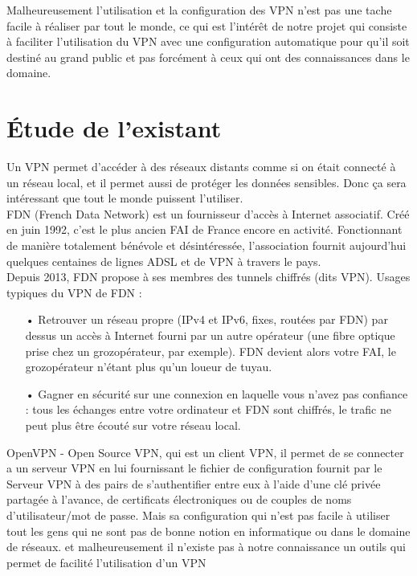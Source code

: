 \documentclass[12pt,a4paper]{article}
\begin{document}
Malheureusement l'utilisation et la configuration des VPN n'est pas une tache facile à réaliser par tout le monde, ce qui est l'intérêt de notre projet qui consiste à faciliter l'utilisation du VPN avec une configuration automatique pour qu'il soit destiné au grand public et pas forcément à ceux qui ont des connaissances dans le domaine.\\
\newpage

\section{Étude de l'existant}
Un VPN permet d'accéder à des réseaux distants comme si on était connecté à un réseau local, et il permet aussi de protéger les données sensibles. Donc ça sera intéressant que tout le monde puissent l'utiliser.\\

FDN (French Data Network) est un fournisseur d'accès à Internet associatif.
Créé en juin 1992, c'est le plus ancien FAI de France encore en activité. Fonctionnant de manière totalement bénévole et désintéressée, l'association fournit aujourd'hui quelques centaines de lignes ADSL et de VPN à travers le pays.\\

Depuis 2013, FDN propose à ses membres des tunnels chiffrés (dits VPN).
Usages typiques du VPN de FDN :
\begin{itemize}
\item[•]Retrouver un réseau propre (IPv4 et IPv6, fixes, routées par FDN) par dessus un accès à Internet fourni par un autre opérateur (une fibre optique prise chez un grozopérateur, par exemple). FDN devient alors votre FAI, le grozopérateur n’étant plus qu’un loueur de tuyau.\\
\item[•]Gagner en sécurité sur une connexion en laquelle vous n’avez pas confiance : tous les échanges entre votre ordinateur et FDN sont chiffrés, le trafic ne peut plus être écouté sur votre réseau local.\\
\end{itemize}

OpenVPN - Open Source VPN, qui est un client VPN,  il permet de se connecter a un serveur VPN  en lui fournissant le fichier de configuration fournit par le Serveur VPN à des pairs de s'authentifier entre eux à l'aide d'une clé privée partagée à l'avance, de certificats électroniques ou de couples de noms d'utilisateur/mot de passe. Mais sa configuration qui n'est pas facile à utiliser tout les gens qui ne sont pas de bonne notion en informatique ou dans le domaine de réseaux. et malheureusement il n'existe pas à notre connaissance un outils qui permet de facilité l'utilisation d'un VPN \\
\end{document}

